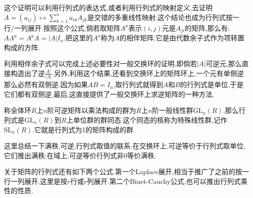 这个证明可以利用行列式的表达式,或者利用行列式的映射定义,去证明$A=(a_{ij})\mapsto\sum_{k=1}^na_{ik}A_{jk}$是交错的多重线性映射.这个结论也成为行列式按一行/一列展开.按照这个公式,倘若取矩阵$A^a$表示$(i,j)$元是$A_{ji}$的矩阵,那么有:$AA^a=A^aA=|A|I_n$.把这里的$A^a$称为$A$的相伴矩阵,它是由代数余子式作为项转置构成的方阵.

利用相伴余子式可以完成上述必要性对一般交换环的证明.即倘若$|A|$可逆元,那么直接构造出了逆$\frac{A'}{|A|}$.另外,利用这个结果,还看到交换环上的矩阵环上,一个元有单侧逆那么必然有双侧逆.因为如果$AB=I_n$,取行列式就得到$A$和$B$的行列式是单位,于是它们都有双侧逆.最后,这直接提供了一般交换环上求逆矩阵的一种方法.

称全体环$R$上$n$阶可逆矩阵以乘法构成的群为$R$上$n$阶一般线性群$\mathrm{GL}_n(R)$.那么行列式是$\mathrm{GL}_n(R)$到$R$上单位群的群同态.这个同态的核称为特殊线性群,记作$\mathrm{SL}_n(R)$.它就是行列式为1的矩阵构成的群.

这里总结一下满秩,可逆,行列式取值的联系.在交换环上,可逆等价于行列式取单位,它们推出满秩;在域上,可逆等价行列式非0等价满秩.

关于矩阵的行列式还有如下两个公式.第一个Laplace展开,相当于推广了之前的按一行一列展开,这里是按$r$行或$r$列展开.第二个Binet-Cauchy公式,也可以推出行列式乘性的性质.

